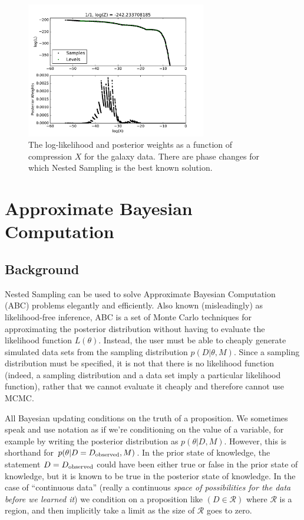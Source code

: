 \documentclass[article, nojss]{jss}
\begin{document}
\begin{figure}[ht!]
\centering
\includegraphics[width=0.7\textwidth]{figures/galaxies_fig3.pdf}
\caption{The log-likelihood and posterior weights as a function
of compression $X$ for the galaxy data. There are phase changes
\citep{skilling2006nested} for which Nested Sampling is the best known
solution.
\label{fig:galaxies_fig3}}
\end{figure}


\section{Approximate Bayesian Computation}
\subsection{Background}
Nested Sampling can be used to solve Approximate Bayesian Computation (ABC)
problems elegantly and efficiently.
Also known (misleadingly) as likelihood-free inference,
ABC
is a set of Monte Carlo techniques for approximating the posterior distribution
without having to evaluate the likelihood function $L(\theta)$. Instead, 
the user must be able to cheaply
generate simulated data sets from the sampling distribution $p(D|\theta, M)$.
Since a sampling distribution must be specified, it is not that there is
no likelihood function (indeed, a sampling distribution and
a data set imply a particular likelihood function), rather that we cannot
evaluate it cheaply and therefore cannot use MCMC.

All Bayesian updating conditions on the truth of a proposition. We sometimes
speak and use notation as if we're conditioning on the value of a variable, for
example by writing the posterior distribution as
$p(\theta | D, M)$. However,
this is shorthand for $p(\theta | D = D_{\rm observed}, M)$.
In the prior state of knowledge, the statement
$D = D_{\rm observed}$ could have been either
true or false in the prior state of knowledge, but it is known to be true
in the posterior state of knowledge.
In the case of ``continuous data'' (really a continuous {\it space of
possibilities for the data before we learned it}) we condition on a
proposition like $(D \in \mathcal{R})$ where $\mathcal{R}$ is a region, and
then implicitly take a limit as the size of $\mathcal{R}$ goes to zero.
\end{document}
